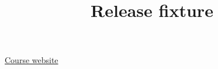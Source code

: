 \documentclass{article}
\title{Release fixture}
\begin{document}

\href{https://example.org/first}{Course website}
\cite{notes}
\printbibliography
\end{document}
